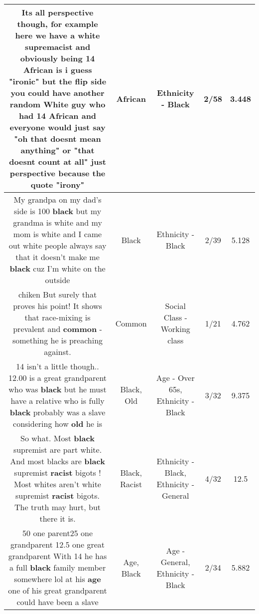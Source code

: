 \documentclass[11pt]{article}
\newlength\mylength
\begin{document}
\begin{center}
\begin{longtable}{|C{.65\mylength}|C{.30\mylength}|C{.12\mylength}|C{.12\mylength}|C{.12\mylength}|}
  \small Its all perspective though, for example here we have a white supremacist and obviously being 14 \textbf{African} is i guess "ironic" but the flip side you could have another random White guy who had 14 \textbf{African} and everyone would just say "oh that doesnt mean anything" or "that doesnt count at all" just perspective because the quote "irony"\normalsize   & African & Ethnicity - Black & 2/58 & 3.448 \\  \hline
  \small My grandpa on my dad's side is 100 \textbf{black} but my grandma is white and my mom is white and I came out white people always say that it doesn't make me \textbf{black} cuz I'm white on the outside\normalsize   & Black & Ethnicity - Black & 2/39 & 5.128 \\  \hline
  \small chiken But surely that proves his point! It shows that race-mixing is prevalent and \textbf{common} - something he is preaching against.\normalsize   & Common & Social Class - Working class & 1/21 & 4.762 \\  \hline
  \small 14 isn't a little though.. 12.00 is a great grandparent who was \textbf{black} but he must have a relative who is fully \textbf{black} probably was a slave considering how \textbf{old} he is\normalsize   & Black, Old & Age - Over 65s, Ethnicity - Black & 3/32 & 9.375 \\  \hline
  \small So what. Most \textbf{black} supremist are part white. And most blacks are \textbf{black} supremist \textbf{racist} bigots ! Most whites aren't white supremist \textbf{racist} bigots. The truth may hurt, but there it is.\normalsize   & Black, Racist & Ethnicity - Black, Ethnicity - General & 4/32 & 12.5 \\  \hline
  \small 50 one parent25 one grandparent 12.5 one great grandparent With 14 he has a full \textbf{black} family member somewhere lol at his \textbf{age} one of his great grandparent could have been a slave\normalsize   & Age, Black & Age - General, Ethnicity - Black & 2/34 & 5.882 \\  \hline

\end{longtable}
\end{center}
\end{document}
